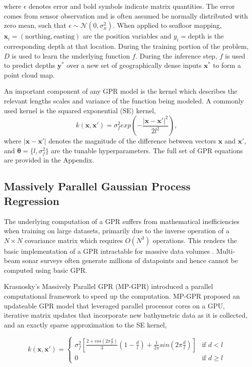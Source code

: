where $\epsilon$ denotes error and bold symbols indicate matrix quantities. The error comes from sensor observation and is often assumed be normally distributed with zero mean, such that $\epsilon \sim \mathcal{N}(0,\sigma_n^{2})$. When applied to seafloor mapping, $\boldsymbol{x}_i = (\mathrm{northing}, \mathrm{easting})$ are the position variables and $y_i = \mathrm{depth}$ is the corresponding depth at that location. During the training portion of the problem, $D$ is used to learn the underlying function $f$.  During the inference step, $f$ is used to predict depths $\boldsymbol{y}^*$ over a new set of geographically dense inputs $\boldsymbol{x^*}$ to form a point cloud map.

An important component of any GPR model is the kernel which describes the relevant lengths scales and variance of the function being modeled. A commonly used kernel is the squared exponential (SE) kernel,
\begin{equation}
    k(\boldsymbol{x},\boldsymbol{x'}) = \sigma_f^2 exp(-\frac{|\boldsymbol{x}-\boldsymbol{x'}|^2}{2l^2}),
\end{equation}
where $|\boldsymbol{x}-\boldsymbol{x'}|$ denotes the magnitude of the difference between vectors $\boldsymbol{x}$ and $\boldsymbol{x'}$, and $\boldsymbol{\theta} = \{l,\sigma_f^2\}$ are the tunable hyperparameters. The full set of GPR equations are provided in the Appendix. 

\subsection{Massively Parallel Gaussian Process Regression}

The underlying computation of a GPR suffers from mathematical inefficiencies when training on large datasets, primarily due to the inverse operation of a $N \times N$ covariance matrix which requires $O(N^3)$ operations. This renders the basic implementation of a GPR intractable for massive data volumes \cite{Rasmussen2006}. Multi-beam sonar surveys often generate millions of datapoints and hence cannot be computed using basic GPR. 

Krasnosky's Massively Parallel GPR (MP-GPR) introduced a parallel computational framework to speed up the computation. MP-GPR proposed an updateable GPR model that leveraged parallel processor cores on a GPU, iterative matrix updates that incorporate new bathymetric data as it is collected, and an exactly sparse approximation to the SE kernel,

\begin{equation}
  k(\boldsymbol{x},\boldsymbol{x'}) =
    \begin{cases}
      \sigma_f^2[\frac{2+cos(2\pi\frac{d}{l})}{3}(1-\frac{d}{l})+\frac{1}{2\pi}sin(2\pi\frac{d}{l})] & \text{if $d < l$}\\
      0 & \text{if $d \geq l$} 
    \end{cases}       
\end{equation}

